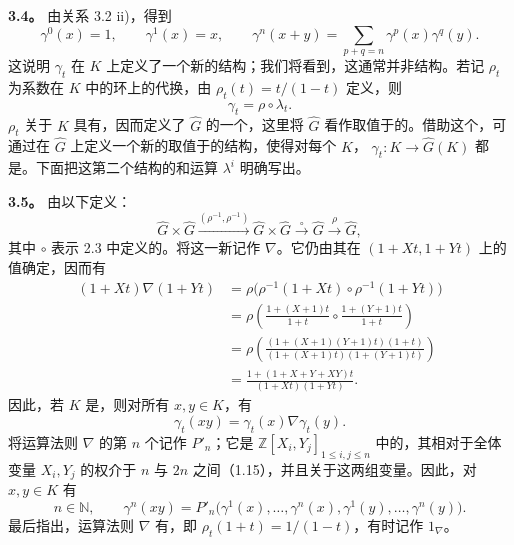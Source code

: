 \textbf{3.4。} 由关系 3.2 ii)，得到
\[
\gamma^0(x)=1,\qquad\gamma^1(x)=x,\qquad
\gamma^n(x+y)=\sum_{p+q=n}\gamma^p(x)\gamma^q(y).
\tag{3.4.1}
\]
这说明 $\gamma_t$ 在 $K$ 上定义了一个新的结构；我们将看到，这通常并非结构。若记 $\rho_t$ 为系数在 $K$ 中的环上的代换，由 $\rho_t(t)=t/(1-t)$ 定义，则
\[
\gamma_t=\rho\circ\lambda_t.
\]
 $\rho_t$ 关于 $K$ 具有，因而定义了 $\widehat G$ 的一个，这里将 $\widehat G$ 看作取值于的。借助这个，可通过在 $\widehat G$ 上定义一个新的取值于的结构，使得对每个 $K$， $\gamma_t:K\longrightarrow\widehat G(K)$ 都是。下面把这第二个结构的和运算 $\lambda^i$ 明确写出。

\textbf{3.5。} 由以下定义：
\[
\widehat G\times\widehat G
\xrightarrow{(\rho^{-1},\rho^{-1})}\widehat G\times\widehat G
\xrightarrow{\circ}\widehat G\xrightarrow{\rho}\widehat G,
\]
其中 $\circ$ 表示 2.3 中定义的。将这一新记作 $\nabla$。它仍由其在 $(1+Xt,1+Yt)$ 上的值确定，因而有
\[
\begin{aligned}
(1+Xt)\nabla(1+Yt)
&=\rho\bigl(\rho^{-1}(1+Xt)\circ\rho^{-1}(1+Yt)\bigr)\\
&=\rho\left(\frac{1+(X+1)t}{1+t}\circ\frac{1+(Y+1)t}{1+t}\right)\\
&=\rho\left(\frac{(1+(X+1)(Y+1)t)(1+t)}{(1+(X+1)t)(1+(Y+1)t)}\right)\\
&=\frac{1+(1+X+Y+XY)t}{(1+Xt)(1+Yt)}.
\end{aligned}
\tag{3.5.1}
\]
因此，若 $K$ 是，则对所有 $x,y\in K$，有
\[
\gamma_t(xy)=\gamma_t(x)\nabla\gamma_t(y).
\tag{3.5.2}
\]
将运算法则 $\nabla$ 的第 $n$ 个记作 $P'_n$；它是 $\mathbb Z[X_i,Y_j]_{1\leqslant i,j\leqslant n}$ 中的，其相对于全体变量 $X_i,Y_j$ 的权介于 $n$ 与 $2n$ 之间（1.15），并且关于这两组变量。因此，对 $x,y\in K$ 有
\[
n\in\mathbb N,\qquad
\gamma^n(xy)=P'_n\bigl(\gamma^1(x),\ldots,\gamma^n(x),\gamma^1(y),\ldots,\gamma^n(y)\bigr).
\tag{3.5.3}
\]
最后指出，运算法则 $\nabla$ 有，即 $\rho_t(1+t)=1/(1-t)$，有时记作 $1_\nabla$。


